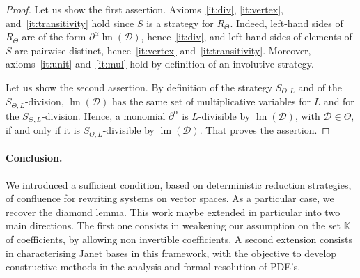 \documentclass[10pt]{easychair}
\theoremstyle{definition}
\newcommand\D{\mathcal{D}}
\DeclareMathOperator{\lm}{lm}
\newcommand\K{\mathbb{K}}
\newcommand\RTheta{R_{\Theta}}
\newcommand\SThetaL{S_{\Theta,L}}
\begin{document}
\begin{proof}
  Let us show the first assertion. Axioms~\ref{it:div}, \ref{it:vertex},
  and~\ref{it:transitivity} hold since $S$ is a strategy for $\RTheta$.
  Indeed, left-hand sides of $\RTheta$ are of the form
  $\partial^\alpha\lm(\D)$, hence~\ref{it:div}, and left-hand sides of
  elements of $S$ are pairwise distinct, hence~\ref{it:vertex}
  and~\ref{it:transitivity}. Moreover, axioms~\ref{it:unit}
  and~\ref{it:mul} hold by definition of an involutive strategy.

  Let us show the second assertion. By definition of the strategy
  $\SThetaL$ and of the $\SThetaL$-division, $\lm(\D)$ has the same set
  of multiplicative variables for $L$ and for the $\SThetaL$-division.
  Hence, a monomial $\partial^\alpha$ is $L$-divisible by $\lm(\D)$, with
  $\D\in\Theta$, if and only if it is $\SThetaL$-divisible by $\lm(\D)$.
  That proves the assertion.
\end{proof}

\paragraph{Conclusion.} We introduced a sufficient condition,
based on deterministic reduction strategies, of confluence for
rewriting systems on vector spaces. As a particular case,
we recover the diamond lemma. This work maybe extended in particular
into two main directions. The first one consists in weakening our assumption
on the set $\K$ of coefficients, by allowing non invertible coefficients.
A second extension consists in characterising Janet bases in this framework,
with the objective to develop constructive methods in the analysis and formal
resolution of PDE's.


\end{document}
